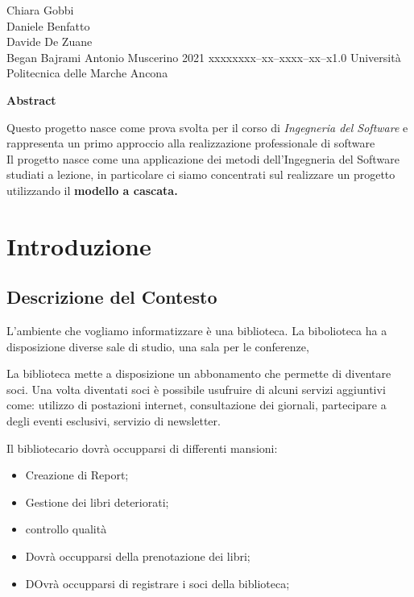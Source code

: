 \documentclass{tstextbook}
\begin{document}
\tsbook{\Huge }
       {Chiara Gobbi \\ Daniele Benfatto \\ Davide De Zuane \\ Began Bajrami}
       {Antonio Muscerino}
       {2021}
       {xxxxx}{xxx--xx--xxxx--xx--x}{1.0}
       {Università Politecnica delle Marche}
       {Ancona}



\begin{center}
	\textbf{\Large Abstract}
\end{center}
Questo progetto nasce come prova svolta per il corso di \textit{Ingegneria del Software} e rappresenta un primo approccio alla realizzazione professionale di software\\
Il progetto nasce come una applicazione dei metodi dell'Ingegneria del Software studiati a lezione, in particolare ci siamo concentrati sul realizzare un progetto utilizzando il  \textbf{modello a cascata.}


\chapter{Introduzione}
\section{Descrizione del Contesto}
L'ambiente che vogliamo informatizzare è una biblioteca.
La bibolioteca ha a disposizione diverse sale di studio, una sala per le conferenze, 


La biblioteca mette a disposizione un abbonamento che permette di diventare soci.
Una volta diventati soci è possibile usufruire di alcuni servizi aggiuntivi come: utilizzo di postazioni internet, consultazione dei giornali, partecipare a degli eventi esclusivi, servizio di newsletter.

Il bibliotecario dovrà occupparsi di differenti mansioni:
\begin{itemize}
	\item Creazione di Report;
	\item Gestione dei libri deteriorati;
	\item controllo qualità 
	\item Dovrà occupparsi della prenotazione dei libri;
	\item DOvrà occupparsi di registrare i soci della biblioteca;
\end{itemize}
\end{document}
